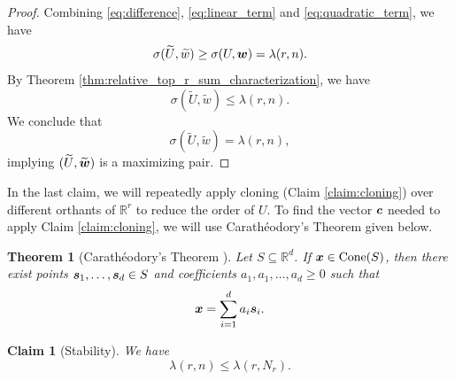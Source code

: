 \documentclass[11pt]{article}
\theoremstyle{plain}
\newtheorem{theorem}{Theorem}[section]
\newtheorem{claim}{Claim}[section]
\numberwithin{equation}{section}
\DeclareMathOperator{\cone}{Cone}
\def\cvec{\mbox{\boldmath $c$}}
\def\w{\mbox{\boldmath $w$}}
\def\s{\mbox{\boldmath $s$}}
\def\x{\mbox{\boldmath $x$}}
\begin{document}
\begin{proof}
Combining \eqref{eq:difference}, \eqref{eq:linear_term} and \eqref{eq:quadratic_term}, we have
\[   \sigma(\widetilde{U}, \widetilde{w}) \ge \sigma(U, \w) = \lambda(r,n).\]
By Theorem \ref{thm:relative_top_r_sum_characterization}, we have
\[ \sigma(\widetilde{U}, \widetilde{w})\le \lambda(r,n).\]
We conclude that 
\[  \sigma(\widetilde{U}, \widetilde{w}) = \lambda(r,n),\]
implying
$(\widetilde{U}, \widetilde{\w})$ is a maximizing pair. 
\end{proof}

In the last claim, we will repeatedly apply cloning (Claim \ref{claim:cloning}) over different orthants of $\mathbb{R}^r$ to reduce the order of $U$. To find the vector $\cvec$ needed to apply Claim \ref{claim:cloning}, we will use Carath\'eodory's Theorem given below.

\begin{theorem}[Carath\'eodory's Theorem {\cite[Corollary 7.1i]{Schrijver_1986}}]\label{theorem:Caratheodory}
Let $S \subseteq \mathbb{R}^d$. If $\x\in\cone(S)$, then there exist points
$\s_1,\ldots,\s_d \in S$ and coefficients $a_1,a_1,\ldots,a_d \geq 0$ such that
\[
\x = \sum_{i=1}^d a_i \s_i.
\]
\end{theorem}

\begin{claim}[Stability]\label{claim:stability} We have 
\[\lambda(r,n)\le \lambda(r, N_r).\]
\end{claim}
\end{document}
